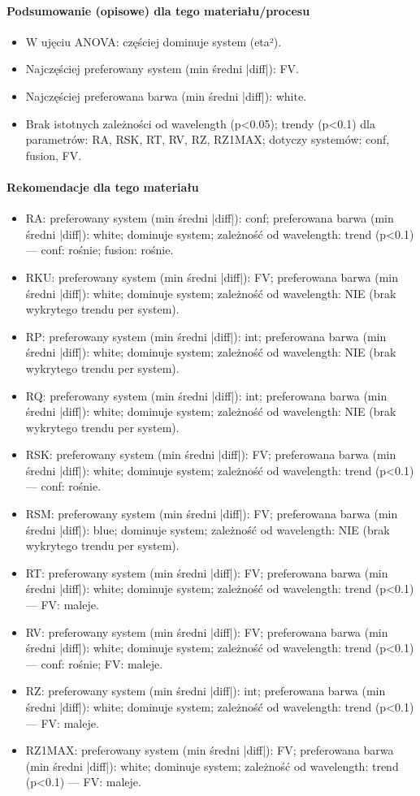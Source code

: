 \documentclass[
  10pt,
]{article}
\begin{document}
\paragraph{Podsumowanie (opisowe) dla tego materiału/procesu}
\begin{itemize}
\item W ujęciu ANOVA: częściej dominuje system (eta²).
\item Najczęściej preferowany system (min średni |diff|): FV.
\item Najczęściej preferowana barwa (min średni |diff|): white.
\item Brak istotnych zależności od wavelength (p<0.05); trendy (p<0.1) dla parametrów: RA, RSK, RT, RV, RZ, RZ1MAX; dotyczy systemów: conf, fusion, FV.
\end{itemize}
\paragraph{Rekomendacje dla tego materiału}
\begin{itemize}
\item RA: preferowany system (min średni |diff|): conf; preferowana barwa (min średni |diff|): white; dominuje system; zależność od wavelength: trend (p<0.1) — conf: rośnie; fusion: rośnie.
\item RKU: preferowany system (min średni |diff|): FV; preferowana barwa (min średni |diff|): white; dominuje system; zależność od wavelength: NIE (brak wykrytego trendu per system).
\item RP: preferowany system (min średni |diff|): int; preferowana barwa (min średni |diff|): white; dominuje system; zależność od wavelength: NIE (brak wykrytego trendu per system).
\item RQ: preferowany system (min średni |diff|): int; preferowana barwa (min średni |diff|): white; dominuje system; zależność od wavelength: NIE (brak wykrytego trendu per system).
\item RSK: preferowany system (min średni |diff|): FV; preferowana barwa (min średni |diff|): white; dominuje system; zależność od wavelength: trend (p<0.1) — conf: rośnie.
\item RSM: preferowany system (min średni |diff|): FV; preferowana barwa (min średni |diff|): blue; dominuje system; zależność od wavelength: NIE (brak wykrytego trendu per system).
\item RT: preferowany system (min średni |diff|): FV; preferowana barwa (min średni |diff|): white; dominuje system; zależność od wavelength: trend (p<0.1) — FV: maleje.
\item RV: preferowany system (min średni |diff|): FV; preferowana barwa (min średni |diff|): white; dominuje system; zależność od wavelength: trend (p<0.1) — conf: rośnie; FV: maleje.
\item RZ: preferowany system (min średni |diff|): int; preferowana barwa (min średni |diff|): white; dominuje system; zależność od wavelength: trend (p<0.1) — FV: maleje.
\item RZ1MAX: preferowany system (min średni |diff|): FV; preferowana barwa (min średni |diff|): white; dominuje system; zależność od wavelength: trend (p<0.1) — FV: maleje.
\end{itemize}
\end{document}
